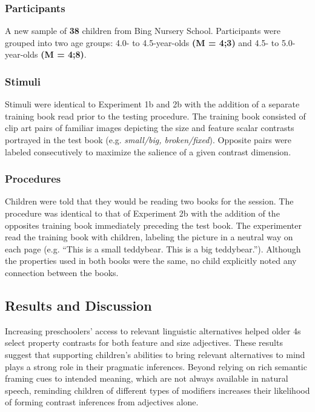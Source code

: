 \documentclass[10pt,letterpaper]{article}
\begin{document}
\subsubsection{Participants}

A new sample of \textbf{38} children from Bing Nursery School. Participants were grouped into two age groups: 4.0- to 4.5-year-olds \textbf{(M = 4;3)} and 4.5- to 5.0-year-olds \textbf{(M = 4;8)}.

\subsubsection{Stimuli}

Stimuli were identical to Experiment 1b and 2b with the addition of a separate training book read prior to the testing procedure.  The training book consisted of clip art pairs of familiar images depicting the size and feature scalar contrasts portrayed in the test book (e.g. \emph{small/big, broken/fixed}).  Opposite pairs were labeled consecutively to maximize the salience of a given contrast dimension. 

\subsubsection{Procedures}

Children were told that they would be reading two books for the session.  The procedure was identical to that of Experiment 2b with the addition of the opposites training book immediately preceding the test book. The experimenter read the training book with children, labeling the picture in a neutral way on each page (e.g. ``This is a small teddybear. This is a big teddybear.'').  Although the properties used in both books were the same, no child explicitly noted any connection between the books. 

\subsection{Results and Discussion}

Increasing preschoolers' access to relevant linguistic alternatives helped older 4s select property contrasts for both feature and size adjectives.  These results suggest that supporting children's abilities to bring relevant alternatives to mind plays a strong role in their pragmatic inferences. Beyond relying on rich semantic framing cues to intended meaning, which are not always available in natural speech, reminding children of different types of modifiers increases their likelihood of forming contrast inferences from adjectives alone. 
\end{document}
